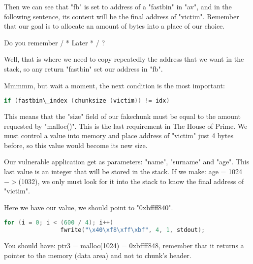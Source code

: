 \documentclass[12pt]{article}
\begin{document}
Then we can see that "fb" is set to address of a "fastbin" in "av", and in
the following sentence, its content will be the final address of "victim".
Remember that our goal is to allocate an amount of bytes into a place of
our choice.
\newline


Do you remember / * Later * / ?
\newline


Well, that is where we need to copy repeatedly the address that we want
in the stack, so any return "fastbin" set our address in "fb".
\newline


Mmmmm, but wait a moment, the next condition is the most important:

\begin{lstlisting}[language=C]
   if (fastbin\_index (chunksize (victim)) != idx)
\end{lstlisting}

This means that the "size" field of our fakechunk must be equal to the
amount requested by "malloc()". This is the last requirement in The House
of Prime. We must control a value into memory and place address of
"victim" just 4 bytes before, so this value would become its new size.
\newline


Our vulnerable application get as parameters: "name", "surname" and "age".
This last value is an integer that will be stored in the stack. If we
make: age = 1024$->$(1032), we only must look for it into the stack to know
the final address of "victim".


Here we have our value, we should point to "0xbffff840".

\begin{lstlisting}[language=C]
        for (i = 0; i < (600 / 4); i++)
                fwrite("\x40\xf8\xff\xbf", 4, 1, stdout);
\end{lstlisting}
	
You should have: ptr3 = malloc(1024) = 0xbffff848, remember that it
returns a pointer to the memory (data area) and not to chunk's header.
\newline
\end{document}
